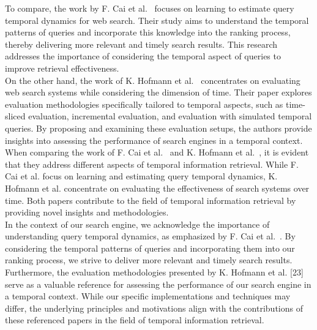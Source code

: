 To compare, the work by F. Cai et al.~\cite{cai2014learning} focuses 
on learning to estimate query temporal dynamics for web search. 
Their study aims to understand the temporal patterns of queries 
and incorporate this knowledge into the ranking process, thereby delivering more 
relevant and timely search results. This research addresses the importance of considering the 
temporal aspect of queries to improve retrieval effectiveness.\\

On the other hand, the work of K. Hofmann et al.~\cite{hofmann2014evaluating} concentrates on evaluating web search systems while considering the dimension of time. Their paper explores evaluation methodologies specifically tailored to temporal aspects, such as time-sliced evaluation,  incremental evaluation, and evaluation with simulated temporal queries. By proposing and examining these evaluation  setups, the authors provide insights into assessing the performance of search engines in a temporal context.\\

When comparing the work of F. Cai et al.~\cite{cai2014learning} and K. Hofmann et al.~\cite{hofmann2014evaluating}, it is 
evident that they address different aspects of temporal information retrieval. While F. Cai et al. 
focus on learning and estimating query temporal dynamics, K. Hofmann et al. concentrate on evaluating the effectiveness 
of search systems over time. Both papers contribute to the field of temporal information retrieval by providing 
novel insights and methodologies.\\

In the context of our search engine, we acknowledge the importance of understanding 
query temporal dynamics, as emphasized by F. Cai et al.~\cite{cai2014learning}. By 
considering the temporal patterns of queries and incorporating them into our ranking process, 
we strive to deliver more relevant and timely search results. Furthermore, the evaluation 
methodologies presented by K. Hofmann et al. [23] serve as a valuable reference for assessing 
the performance of our search engine in a temporal context. While our specific implementations 
and techniques may differ, the underlying principles and motivations align with the 
contributions of these referenced papers in the field of temporal information retrieval.\\





